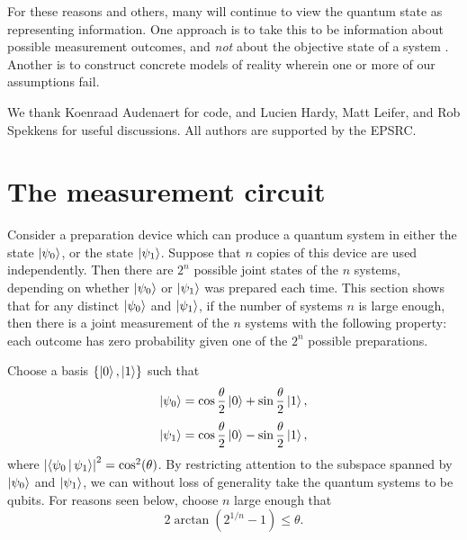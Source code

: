 \documentclass[amsmath,amssymb,superscriptaddress,twocolumn,pra]{revtex4-1}
\newcommand{\abs}[1]{\left\lvert{#1}\right\rvert}
\begin{document}
For these reasons and others, many will continue to view the quantum state as representing information. One approach is to take this to be information about possible measurement outcomes, and \emph{not} about the objective state of a system \cite{QUBISM}. Another is to construct concrete models of reality wherein one or more of our assumptions fail.

\begin{acknowledgments}
We thank Koenraad Audenaert for code, and Lucien Hardy, Matt Leifer, and Rob Spekkens for useful discussions. All authors are supported by the EPSRC.
\end{acknowledgments}



\appendix
\section{The measurement circuit}\label{eqnsol}

Consider a preparation device which can produce a quantum system in either the state $\ket{\psi_0}$, or the state $\ket{\psi_1}$. Suppose that $n$ copies of this device are used independently. Then there are $2^n$ possible joint states of the $n$ systems, depending on whether $\ket{\psi_0}$ or $\ket{\psi_1}$ was prepared each time. This section shows that for any distinct $\ket{\psi_0}$ and $\ket{\psi_1}$, if the number of systems $n$ is large enough, then there is a joint measurement of the $n$ systems with the following property:  each outcome has zero probability given one of the $2^n$ possible preparations.

Choose a basis  $\{\ket{0},\ket{1}\}$ such that 
\begin{equation}
\ket{\psi_0} = \cos\frac\theta2\ket0 + \sin\frac\theta2\ket1,
\end{equation}
\begin{equation}
  \ket{\psi_1} = \cos\frac\theta2\ket0 - \sin\frac\theta2\ket1,
\end{equation}
where $\abs{\Braket{\psi_0|\psi_1}}^2 = \cos^2(\theta)$. By restricting attention to the subspace spanned by $\ket{\psi_0}$ and $\ket{\psi_1}$, we can without loss of generality take the quantum systems to be qubits. For reasons seen below, choose $n$ large enough that
\begin{equation}
2\arctan\left(2^{1/n} - 1\right) \leq \theta.  \label{ppreq}
\end{equation}

\end{document}
